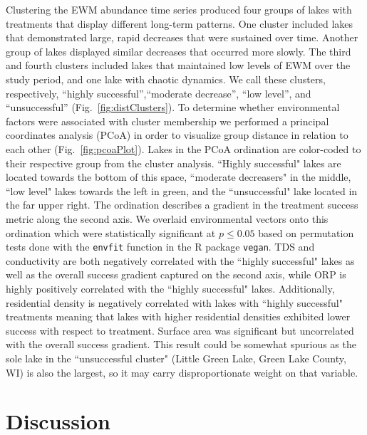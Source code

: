 \documentclass{article}
\begin{document}
Clustering the EWM abundance time series produced four groups of lakes with treatments that display different long-term patterns. One cluster included lakes that demonstrated large, rapid decreases that were sustained over time. Another group of lakes displayed similar decreases that occurred more slowly. The third and fourth clusters included lakes that maintained low levels of EWM over the study period, and one lake with chaotic dynamics. We call these clusters, respectively, ``highly successful”,``moderate decrease”, ``low level”, and ``unsuccessful” (Fig.~\ref{fig:distClusters}). To determine whether environmental factors were associated with cluster membership we performed a principal coordinates analysis (PCoA) in order to visualize group distance in relation to each other (Fig.~\ref{fig:pcoaPlot}). Lakes in the PCoA ordination are color-coded to their respective group from the cluster analysis. ``Highly successful" lakes are located towards the bottom of this space, ``moderate decreasers" in the middle, ``low level" lakes towards the left in green, and the ``unsuccessful" lake located in the far upper right. The ordination describes a gradient in the treatment success metric along the second axis. We overlaid environmental vectors onto this ordination which were statistically significant at $p\leq0.05$ based on permutation tests done with the \verb!envfit! function in the R package \verb!vegan!. TDS and conductivity are both negatively correlated with the ``highly successful" lakes as well as the overall success gradient captured on the second axis, while ORP is highly positively correlated with the ``highly successful" lakes. Additionally, residential density is negatively correlated with lakes with ``highly successful" treatments meaning that lakes with higher residential densities exhibited lower success with respect to treatment. Surface area was significant but uncorrelated with the overall success gradient. This result could be somewhat spurious as the sole lake in the ``unsuccessful cluster" (Little Green Lake, Green Lake County, WI) is also the largest, so it may carry disproportionate weight on that variable. 


\vspace{8mm}

\section*{Discussion}
\end{document}
